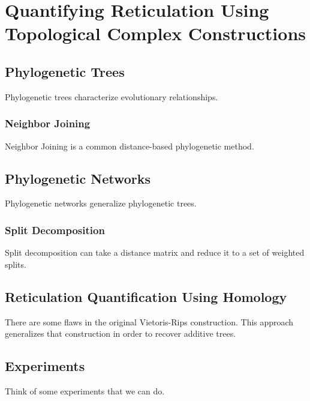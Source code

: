 \chapter{Quantifying Reticulation Using Topological Complex Constructions}
\label{ch:complex_construction}

\section{Phylogenetic Trees}

Phylogenetic trees characterize evolutionary relationships.
\subsection{Neighbor Joining}

Neighbor Joining is a common distance-based phylogenetic method.

\section{Phylogenetic Networks}

Phylogenetic networks generalize phylogenetic trees.

\subsection{Split Decomposition}

Split decomposition can take a distance matrix and reduce it to a set of weighted splits.

\section{Reticulation Quantification Using Homology}

There are some flaws in the original Vietoris-Rips construction.
This approach generalizes that construction in order to recover additive trees.

\section{Experiments}

Think of some experiments that we can do.